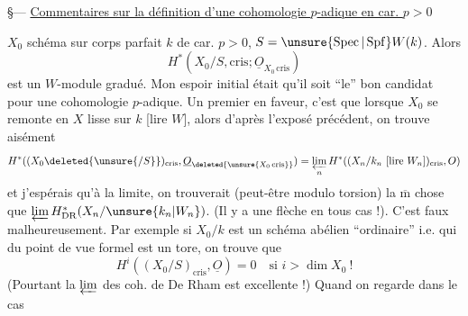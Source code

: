 \S--- \uline{Commentaires sur la définition d'une cohomologie $p$-adique en car. $p>0$}

$X_0$ schéma sur corps parfait $k$ de car. $p>0$, $S=\unsure{\operatorname{Spec}|\operatorname{Spf}}W(k)$. Alors
\[
H^*(X_0/S,\mathrm{cris};\underline O_{X_0\,\mathrm{cris}})
\]
est un $W$-module gradué.  Mon espoir initial était qu'il soit  ``le'' bon candidat pour une cohomologie $p$-adique. Un premier   en faveur, c'est que lorsque $X_0$  se remonte en $X$  lisse sur $k$ [lire $W$], alors d'après l'exposé précédent, on trouve aisément
\[
H^*((X_0\deleted{\unsure{/S}})_{\mathrm{cris}},\underline O_{\deleted{\unsure{X_0\,\mathrm{cris}}}})
=\varprojlim_n H^*((X_n/k_n\ \text{[lire $W_n$]})_{\mathrm{cris}},O)
\]
et j'espérais qu'à la limite, on trouverait (peut-être modulo torsion) la $\overline{\mathrm m}$ chose que $\varprojlim H^*_{\mathrm{DR}}(X_n/\unsure{k_n|W_n})$.
(Il y  a une flèche en tous cas !).
C'est faux malheureusement. Par exemple si $X_0/k$ est un schéma abélien ``ordinaire'' i.e. qui du point de vue formel est un tore, on trouve que
\[
H^i((X_0/S)_{\mathrm{cris}},\underline O)=0\quad\text{si }i>\dim X_0\ !
\]
(Pourtant la $\varprojlim$ des coh. de De Rham est excellente !)
 Quand on regarde dans le cas

